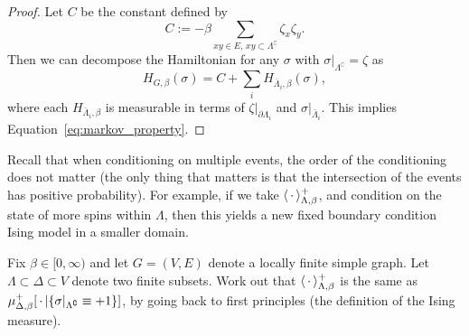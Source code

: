 \begin{proof}
    Let $C$ be the constant defined by
    \[
        C:=-\beta\sum_{xy\in E,\,xy\subset\Lambda^\complement}\zeta_x\zeta_y.
    \]
    Then we can decompose the Hamiltonian for any $\sigma$ with
    $\sigma|_{\Lambda^\complement}=\zeta$ as
    \[
        H_{G,\beta}(\sigma)=C+\sum_i H_{\bar\Lambda_i,\beta}(\sigma),
    \]
    where each $H_{\bar\Lambda_i,\beta}$ is measurable in terms of
    $\zeta|_{\partial\Lambda_i}$ and $\sigma|_{\bar\Lambda_i}$.
    This implies Equation~\eqref{eq:markov_property}.
\end{proof}

\begin{remark}
    Recall that when conditioning on multiple events,
    the order of the conditioning does not matter
    (the only thing that matters is that the intersection of the events has positive probability).
    For example, if we take $\langle\,\cdot\,\rangle_{\Lambda,\beta}^+$,
    and condition on the state of more spins within $\Lambda$,
    then this yields a new fixed boundary condition Ising model in a smaller domain.
\end{remark}

\begin{exercise}
    Fix $\beta\in[0,\infty)$
    and let $G=(V,E)$ denote a locally finite simple graph.
    Let $\Lambda\subset\Delta\subset V$ denote two finite subsets.
    Work out that $\langle\,\cdot\,\rangle_{\Lambda,\beta}^+$ is the same as
    $\mu_{\Delta,\beta}^+[\,\cdot\,|\{\sigma|_{\Lambda^\complement}\equiv+1\}]$,
    by going back to first principles (the definition of the Ising measure).
\end{exercise}
